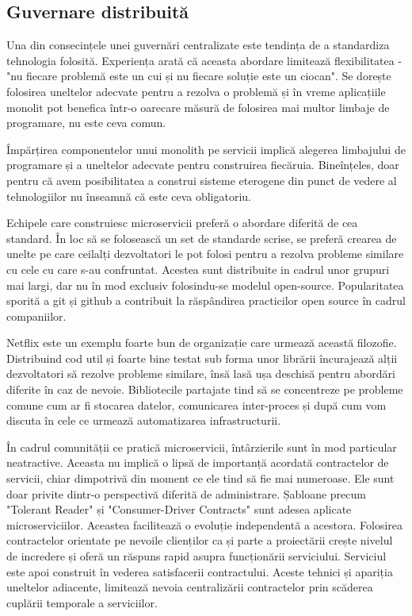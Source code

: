 \documentclass[12pt, a4paper, oneside, romanian]{teza-upb}
\begin{document}
\subsection{Guvernare distribuită}

Una din consecințele unei guvernări centralizate este tendința de a standardiza tehnologia folosită. Experiența arată că aceasta abordare limitează flexibilitatea - "nu fiecare problemă este un cui și nu fiecare soluție este un ciocan". Se dorește folosirea uneltelor adecvate pentru a rezolva o problemă și în vreme aplicațiile monolit pot benefica într-o oarecare măsură de folosirea mai multor limbaje de programare, nu este ceva comun.  

Împărțirea componentelor unui monolith pe servicii implică alegerea limbajului de programare și a uneltelor adecvate pentru construirea fiecăruia. Bineînțeles, doar pentru că avem posibilitatea a construi sisteme eterogene din punct de vedere al tehnologiilor nu înseamnă că este ceva obligatoriu. 

Echipele care construiesc microservicii preferă o abordare diferită de cea standard. În loc să se folosească un set de standarde scrise, se preferă crearea de unelte pe care ceilalți dezvoltatori le pot folosi pentru a rezolva probleme similare cu cele cu care s-au confruntat. Acestea sunt distribuite in cadrul unor grupuri mai largi, dar nu în mod exclusiv folosindu-se modelul open-source. Popularitatea sporită a git și github a contribuit la răspândirea practicilor open source în cadrul companiilor. 

Netflix este un exemplu foarte bun de organizație care urmează această filozofie. Distribuind cod util și foarte bine testat sub forma unor librării încurajează alții dezvoltatori să rezolve probleme similare, însă lasă ușa deschisă pentru abordări diferite în caz de nevoie. Bibliotecile partajate tind să se concentreze pe probleme comune cum ar fi stocarea datelor, comunicarea inter-proces și după cum vom discuta în cele ce urmează automatizarea infrastructurii.

În cadrul comunității ce pratică microservicii, întârzierile sunt în mod particular neatractive. Aceasta nu implică o lipsă de importanță acordată contractelor de servicii, chiar dimpotrivă din moment ce ele tind să fie mai numeroase. Ele sunt doar privite dintr-o perspectivă diferită de administrare. Șabloane precum "Tolerant Reader" și "Consumer-Driver Contracts" sunt adesea aplicate microserviciilor. Aceastea facilitează o evoluție independentă a acestora. Folosirea contractelor orientate pe nevoile clienților ca și parte a proiectării crește nivelul de incredere și oferă un răspuns rapid asupra funcționării serviciului. Serviciul este apoi construit în vederea satisfacerii contractului. Aceste tehnici și apariția uneltelor adiacente, limitează nevoia centralizării contractelor prin scăderea cuplării temporale a serviciilor. 
\end{document}
